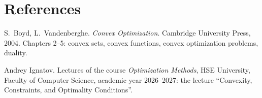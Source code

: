\documentclass[11pt,a4paper]{article}
\begin{document}
\section{References}\label{sec:references}

\begin{enumerate}[label={[\arabic*]}, leftmargin=*]
  \item S.~Boyd, L.~Vandenberghe. \emph{Convex Optimization}. Cambridge University Press, 2004. Chapters 2–5: convex sets, convex functions, convex optimization problems, duality.
  \item Andrey Ignatov. Lectures of the course \emph{Optimization Methods}, HSE University, Faculty of Computer Science, academic year 2026–2027: the lecture “Convexity, Constraints, and Optimality Conditions”.
\end{enumerate}
\end{document}

